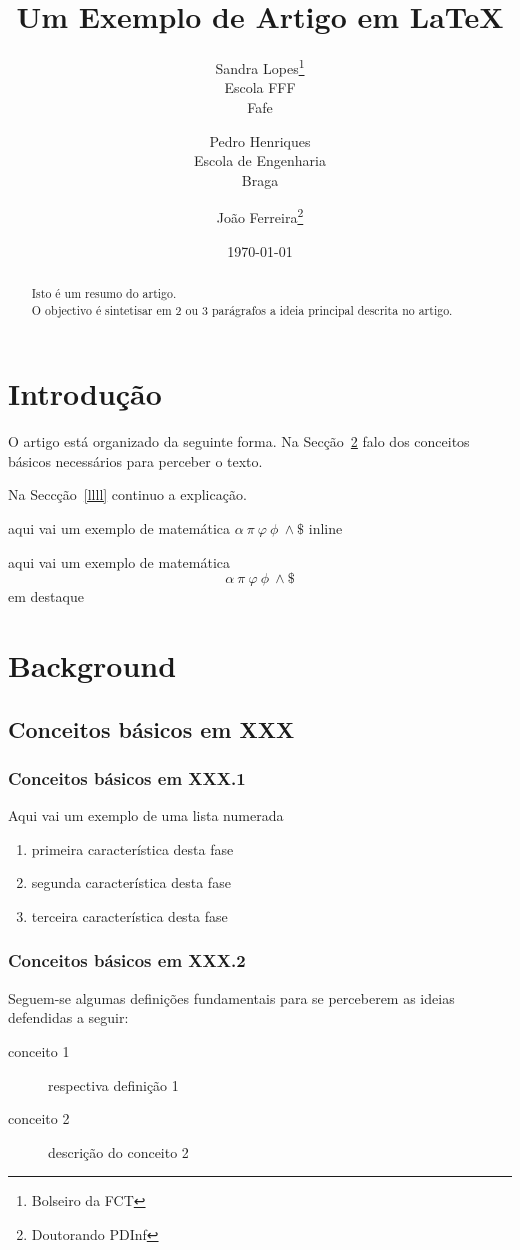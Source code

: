 \documentclass{article}
\title{Um Exemplo de Artigo em \LaTeX}
\author{Sandra Lopes\thanks{Bolseiro da FCT}\\Escola FFF\\ Fafe
        \and
        Pedro Henriques\\Escola de Engenharia\\ Braga
        \and João Ferreira\thanks{Doutorando PDInf} }
\date{\today}
\begin{document}
\maketitle

\begin{abstract}
\noindent Isto é um resumo do artigo.\\
O objectivo é sintetisar em 2 ou 3 parágrafos a ideia principal descrita no artigo.
\end{abstract}


\section{Introdução}

O artigo está organizado da seguinte forma.
Na Secção~\ref{backg} falo dos conceitos básicos necessários para perceber o texto.

Na Seccção~\ref{llll} continuo a explicação.


aqui vai um exemplo de matemática $\alpha\   \pi \  \varphi\ \phi\ \wedge \$ $ inline

aqui vai um exemplo de matemática \[ \alpha\   \pi \  \varphi\ \phi\ \wedge \$ \] em destaque


\section{Background} \label{backg}
\subsection{Conceitos básicos em XXX}
\subsubsection{Conceitos básicos em XXX.1}
Aqui vai um exemplo de uma lista numerada
\begin{enumerate}
\item primeira característica desta fase
\item segunda característica desta fase
\item terceira característica desta fase
\end{enumerate}

\subsubsection{Conceitos básicos em XXX.2}
Seguem-se algumas definições fundamentais para se perceberem as ideias
defendidas a seguir:
\begin{description}
\item[conceito 1] respectiva definição 1
\item[conceito 2] descrição do  conceito 2
\end{description}
\end{document}
